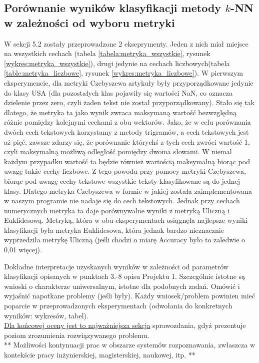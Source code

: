 \documentclass{classrep}
\begin{document}
\subsection{Porównanie wyników klasyfikacji metody $k$-NN w zależności od wyboru metryki}
W sekcji 5.2 zostały przeprowadzone 2 ekseprymenty. Jeden z nich miał miejsce na wszystkich cechach (tabela \ref{tabela:metryka_wszystkie}, rysunek \ref{wykres:metryka_wszystkie}), drugi jedynie na cechach liczbowych(tabela \ref{table:metryka_liczbowe}, rysunek \ref{wykres:metryka_liczbowe}). W pierwszym eksperymencie, dla metryki Czebyszewa artykuły były przyporządkowane jedynie do klasy USA (dla pozostałych klas pojawiły się wartości NaN, co oznacza dzielenie przez zero, czyli żaden tekst nie został przyporządkowany). Stało się tak dlatego, że metryka ta jako wynik zwraca maksymaną wartość bezwzględną różnic pomiędzy kolejnymi cechami z obu wektorów. Jako, że w celu porównania dwóch cech tekstowych korzystamy z metody trigramów, a cech tekstowych jest aż pięć, zawsze zdarzy się, że porównanie którychś z tych cech zwróci wartość 1, czyli maksymalną możliwą odległość pomiędzy dwoma słowami. W niemal każdym przypadku wartość ta będzie również wartością maksymalną biorąc pod uwagę także cechy liczbowe. Z tego powodu przy pomocy metryki Czebyszewa, biorąc pod uwagę cechy tekstowe wszystkie teksty klasyfikowane są do jednej klasy. Dlatego metryka Czebyszewa w formie w jakiej została zaimplementowana w naszym programie nie nadaje się do cech tekstowych. Jednak przy cechach numerycznych metryka ta daje porównywalne wyniki z metryką Uliczną i Euklidesową. Metryką, która w obu eksperymentach osiągnęła najlepsze wyniki klasyfikacji była metryka Euklidesowa, która jednak bardzo nieznacznie wyprzedziła metrykę Uliczną (jeśli chodzi o miarę Accuracy było to zaledwie o 0,01 więcej).

Dokładne interpretacje uzyskanych wyników w zależności od parametrów klasyfikacji
opisanych w punktach 3.-8 opisu Projektu 1. 
Szczególnie istotne są wnioski o charakterze uniwersalnym, istotne dla podobnych zadań. 
Omówić i wyjaśnić napotkane problemy (jeśli były). Każdy wniosek/problem powinien mieć poparcie
w przeprowadzonych eksperymentach (odwołania do konkretnych wyników: wykresów,
tabel). \\
\underline{Dla końcowej oceny jest to najważniejsza sekcja} sprawozdania, gdyż prezentuje poziom
zrozumienia rozwiązywanego problemu.\\

** Możliwości kontynuacji prac w obszarze systemów rozpoznawania, zwłaszcza w kontekście pracy inżynierskiej,
magisterskiej, naukowej, itp. **\\
\end{document}
